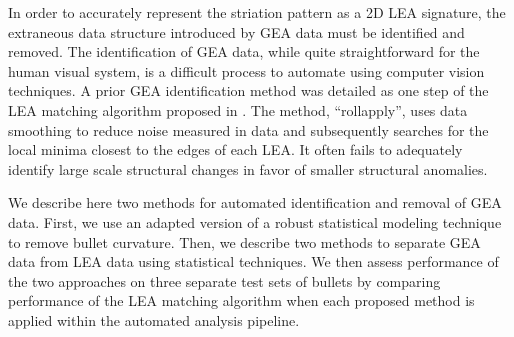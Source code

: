 \documentclass[12pt]{article}
\begin{document}
In order to accurately represent the striation pattern as a 2D LEA
signature, the extraneous data structure introduced by GEA data must be
identified and removed. The identification of GEA data, while quite
straightforward for the human visual system, is a difficult process to
automate using computer vision techniques. A prior GEA identification
method was detailed as one step of the LEA matching algorithm proposed
in \citet{Hare1}. The method, ``rollapply'', uses data smoothing to
reduce noise measured in data and subsequently searches for the local
minima closest to the edges of each LEA. It often fails to adequately
identify large scale structural changes in favor of smaller structural
anomalies.

{\color{teal}{This would replace the paragraph below: This paper describes two methods for automated identification and removal of GEA data. We first describe the data structure and source of test set bullets, followed by a description of methods for GEA data identification. Both methods begin by using an adapted version of a robust statistical modeling technique to remove bullet curvature.  Two distinct approaches are then applied to separate GEA data from LEA data using statistical techniques. Finally, a performance assessment of the two approaches is completed by comparing performance of each LEA matching algorithm as it functions in the automated analysis pipeline for three different bullet test sets.}}

We describe here two methods for automated identification and removal of
GEA data. First, we use an adapted version of a robust statistical
modeling technique to remove bullet curvature. Then, we describe two
methods to separate GEA data from LEA data using statistical techniques.
We then assess performance of the two approaches on three separate test
sets of bullets by comparing performance of the \citet{Hare1} LEA
matching algorithm when each proposed method is applied within the
automated analysis pipeline.
\end{document}
